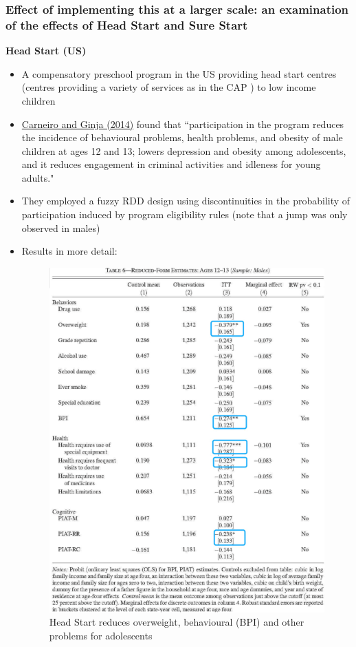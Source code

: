 \subsubsection{Effect of implementing this at a larger scale: an examination of the effects of Head Start and Sure Start}
\textbf{Head Start (US)}
\begin{itemize}
    \item A compensatory preschool program in the US providing head start centres (centres providing a variety of services as in the CAP ) to low income children 
    \item \href{https://www.aeaweb.org/articles?id=10.1257/pol.6.4.135}{Carneiro and Ginja (2014)} found that ``participation in the program reduces the
incidence of behavioural problems, health problems, and
obesity of male children at ages 12 and 13; lowers depression
and obesity among adolescents, and it reduces engagement in
criminal activities and idleness for young adults."
    \item They employed a fuzzy RDD design using discontinuities
in the probability of participation induced by program eligibility
rules (note that a jump was only observed in males)
\item Results in more detail: 
        \begin{figure}[H]%
    \centering
    \includegraphics[width=11.5cm]{images/ch4/HSeval.png}
    \caption{Head Start reduces overweight, behavioural (BPI) and other problems for adolescents}
    \label{CAP_eval}
    \end{figure}
\end{itemize}
